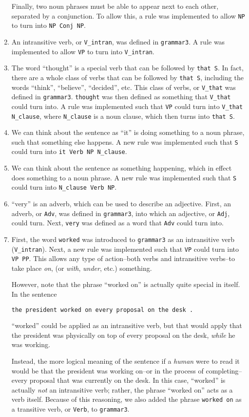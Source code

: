 \documentclass[11pt]{article}
\newcommand{\code}[1]{\texttt{#1}}
\begin{document}
\begin{enumerate}
	Finally, two noun phrases must be able to appear next to each other, separated by a conjunction. To allow this, a rule was implemented to allow \code{NP} to turn into \code{NP Conj NP}.
\item 
	An intransitive verb, or \code{V\_intran}, was defined in \code{grammar3}. A rule was implemented to allow \code{VP} to turn into \code{V\_intran}.
\item 
	The word ``thought'' is a special verb that can be followed by \code{that S}. In fact, there are a whole class of verbs that can be followed by \code{that S}, including the words ``think'', ``believe'', ``decided'', etc. This class of verbs, or \code{V\_that} was defined in \code{grammar3}. \code{thought} was then defined as something that \code{V\_that} could turn into. A rule was implemented such that \code{VP} could turn into \code{V\_that N\_clause}, where \code{N\_clause} is a noun clause, which then turns into \code{that S}.
\item 
	We can think about the sentence as ``it'' is doing something to a noun phrase, such that something else happens. A new rule was implemented such that \code{S} could turn into \code{it Verb NP N\_clause}.
\item 
	We can think about the sentence as something happening, which in effect does something to a noun phrase. A new rule was implemented such that \code{S} could turn into \code{N\_clause Verb NP}.
\item 
	``very'' is an adverb, which can be used to describe an adjective. First, an adverb, or \code{Adv}, was defined in \code{grammar3}, into which an adjective, or \code{Adj}, could turn. Next, \code{very} was defined as a word that \code{Adv} could turn into.
\item
	First, the word \code{worked} was introduced to \code{grammar3} as an intransitive verb (\code{V\_intran}). Next, a new rule was implemented such that \code{VP} could turn into \code{VP PP}. This allows any type of action--both verbs and intransitive verbs--to take place \textit{on}, (or \textit{with}, \textit{under}, etc.) something.
	
	However, note that the phrase ``worked on'' is actually quite special in itself. In the sentence
	
	\code{the president worked on every proposal on the desk .}
	
	``worked'' could be applied as an intransitive verb, but that would apply that the president was physically on top of every proposal on the desk, \textit{while} he was working. 
	
	Instead, the more logical meaning of the sentence if a \textit{human} were to read it would be that the president was working on--or in the process of completing--every proposal that was currently on the desk. In this case, ``worked'' is actually \textit{not} an intransitive verb; rather, the phrase ``worked on'' acts as a verb itself. Because of this reasoning, we also added the phrase \code{worked on} as a transitive verb, or \code{Verb}, to \code{grammar3}.
\end{enumerate} 
\end{document}

